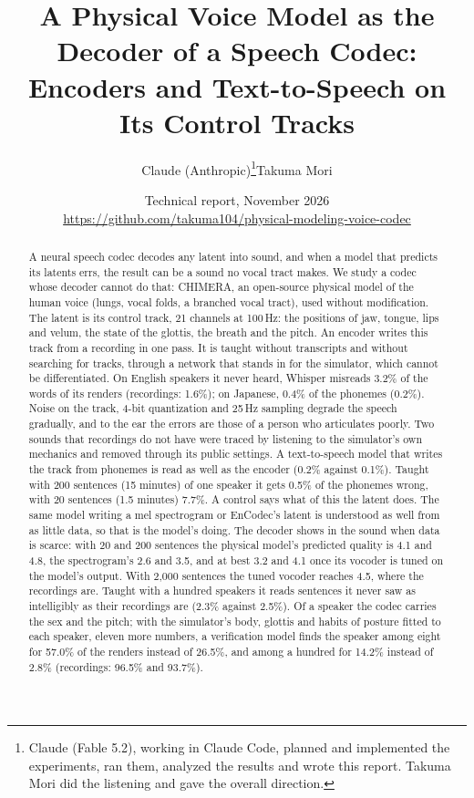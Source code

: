 \documentclass[10pt,a4paper,twocolumn]{article}
\title{\bfseries A Physical Voice Model as the Decoder of a Speech Codec:\\
Encoders and Text-to-Speech on Its Control Tracks}
\author{Claude (Anthropic)\thanks{Claude (Fable 5.2), working in Claude Code, planned and implemented
the experiments, ran them, analyzed the results and wrote this report. Takuma Mori did the listening and gave the
overall direction.}\qquad Takuma Mori}
\date{{\small Technical report, November 2026}\\
{\small\url{https://github.com/takuma104/physical-modeling-voice-codec}}}
\begin{document}
\maketitle

\begin{abstract}
A neural speech codec decodes any latent into sound, and when a model that predicts its latents
errs, the result can be a sound no vocal tract makes. We study a codec whose decoder cannot do
that: CHIMERA, an open-source physical model of the human voice (lungs, vocal folds, a branched
vocal tract), used without modification. The latent is its control track, 21 channels at 100\,Hz:
the positions of jaw, tongue, lips and velum, the state of the glottis, the breath and the pitch.
An encoder writes this track from a recording in one pass. It is taught without transcripts and
without searching for tracks, through a network that stands in for the simulator, which cannot be
differentiated. On English speakers it never heard, Whisper misreads 3.2\% of the words of its
renders (recordings: 1.6\%); on Japanese, 0.4\% of the phonemes (0.2\%). Noise on the track,
4-bit quantization and 25\,Hz sampling degrade the speech gradually, and to the ear the errors
are those of a person who articulates poorly. Two sounds that recordings do not have were traced
by listening to the simulator's own mechanics and removed through its public settings. A
text-to-speech model that writes the track from phonemes is read as well as the encoder (0.2\%
against 0.1\%). Taught with 200 sentences (15 minutes) of one speaker it gets 0.5\% of the
phonemes wrong, with 20 sentences (1.5 minutes) 7.7\%. A control says what of this the latent
does. The same model writing a mel spectrogram or EnCodec's latent is understood as well from
as little data, so that is the model's doing. The decoder shows in the sound when data is
scarce: with 20 and 200 sentences the physical model's predicted quality is 4.1 and 4.8, the
spectrogram's 2.6 and 3.5, and at best 3.2 and 4.1 once its vocoder is tuned on the model's
output. With 2,000 sentences the tuned vocoder reaches 4.5, where the recordings are. Taught with a hundred speakers it reads sentences it never
saw as intelligibly as their recordings are (2.3\% against 2.5\%). Of a speaker the codec
carries the sex and the pitch; with the simulator's body, glottis and habits of posture fitted
to each speaker, eleven more numbers, a verification model finds the speaker among eight for
57.0\% of the renders instead of 26.5\%, and among a hundred for 14.2\% instead of
2.8\% (recordings: 96.5\% and 93.7\%).
\end{abstract}
\end{document}
